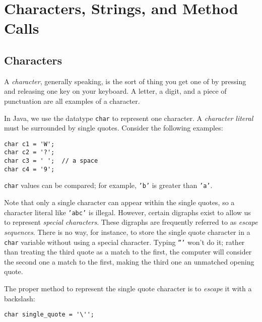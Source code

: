 
\chapter{Characters, Strings, and Method Calls}
\label{chapter:char}

\minitoc

\section{Characters}
\label{section:characters}

A \textit{character}, generally speaking, is the sort of thing you get one of by pressing and releasing one key on your keyboard.  A letter, a digit, and a piece of punctuation are all examples of a character.

In Java, we use the datatype \texttt{char} to represent one character.  A \textit{character literal} must be surrounded by single quotes.  Consider the following examples:

\begin{verbatim}
char c1 = 'W';
char c2 = '?';
char c3 = ' ';  // a space
char c4 = '9';
\end{verbatim}

\texttt{char} values can be compared; for example, \texttt{'b'} is greater than \texttt{'a'}.

Note that only a single character can appear within the single quotes, so a character literal like \texttt{'abc'} is illegal.  However, certain digraphs exist to allow us to represent \textit{special characters}.  These digraphs are frequently referred to as \textit{escape sequences}.  There is no way, for instance, to store the single quote character in a \texttt{char} variable without using a special character.  Typing \texttt{'''} won't do it; rather than treating the third quote as a match to the first, the computer will consider the second one a match to the first, making the third one an unmatched opening quote.

The proper method to represent the single quote character is to \textit{escape} it with a backslash:

\begin{verbatim}
char single_quote = '\'';
\end{verbatim}

